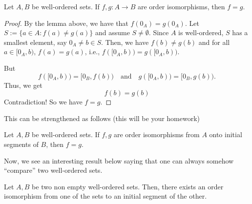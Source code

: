 



\begin{lemma}
  Let $A,B$ be well-ordered sets. If $f,g:A\to B$ are order isomorphisms, then $f=g$.
\end{lemma}
\begin{proof}
  By the lemma above, we have that $f(0_A)=g(0_A)$. Let $S:=\{a\in A:f(a)\neq g(a)\}$ and assume $S\neq \emptyset$. Since $A$ is well-ordered, $S$ has a smallest element, say $0_A\neq b\in S$. Then, we have $f(b)\neq g(b)$ and for all $a\in [0_A,b)$, $f(a)=g(a)$, i.e., $f([0_A,b))=g([0_A,b))$.

  But
  \[
  f([0_A,b))=[0_B,f(b)) \quad \text{and} \quad g([0_A,b))=[0_B,g(b)).
  \]
  Thus, we get
  \[
  f(b)=g(b)
  \]
  Contradiction! So we have $f=g$.
\end{proof}

This can be strengthened as follows (this will be your homework)
\begin{lemma}
  Let $A,B$ be well-ordered sets. If $f,g$ are order isomorphisms from $A$ onto initial segments of $B$, then $f=g$.
\end{lemma}

Now, we see an interesting result below saying that one can always somehow ``compare'' two well-ordered sets.

\begin{theorem}\label{thm:compare_well_ordered_sets}
  Let $A,B$ be two non empty well-ordered sets. Then, there exists an order isomorphism from one of the sets to an initial segment of the other.
\end{theorem}

